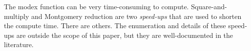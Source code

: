 The modex function can be very time-consuming to compute.
Square-and-multiply and Montgomery reduction are two \emph{speed-ups}
that are used to shorten the compute time.  There are others.
The enumeration and details of these speed-ups are outside the scope of this paper,
but they are well-documented in the literature.
\cite{Koc}\cite{Schneier}\cite{HAC}

